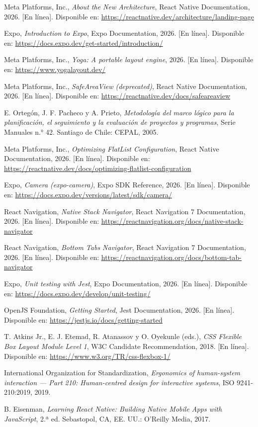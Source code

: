 \begin{enumerate}[label={[\arabic*]}, leftmargin=*, itemsep=3pt]
    \item Meta Platforms, Inc., \textit{About the New Architecture}, React Native Documentation, 2026. [En línea]. Disponible en: \url{https://reactnative.dev/architecture/landing-page}
    \item Expo, \textit{Introduction to Expo}, Expo Documentation, 2026. [En línea]. Disponible en: \url{https://docs.expo.dev/get-started/introduction/}
    \item Meta Platforms, Inc., \textit{Yoga: A portable layout engine}, 2026. [En línea]. Disponible en: \url{https://www.yogalayout.dev/}
    \item Meta Platforms, Inc., \textit{SafeAreaView (deprecated)}, React Native Documentation, 2026. [En línea]. Disponible en: \url{https://reactnative.dev/docs/safeareaview}
    \item E. Ortegón, J. F. Pacheco y A. Prieto, \textit{Metodología del marco lógico para la planificación, el seguimiento y la evaluación de proyectos y programas}, Serie Manuales n.° 42. Santiago de Chile: CEPAL, 2005.
    \item Meta Platforms, Inc., \textit{Optimizing FlatList Configuration}, React Native Documentation, 2026. [En línea]. Disponible en: \url{https://reactnative.dev/docs/optimizing-flatlist-configuration}
    \item Expo, \textit{Camera (expo-camera)}, Expo SDK Reference, 2026. [En línea]. Disponible en: \url{https://docs.expo.dev/versions/latest/sdk/camera/}
    \item React Navigation, \textit{Native Stack Navigator}, React Navigation 7 Documentation, 2026. [En línea]. Disponible en: \url{https://reactnavigation.org/docs/native-stack-navigator}
    \item React Navigation, \textit{Bottom Tabs Navigator}, React Navigation 7 Documentation, 2026. [En línea]. Disponible en: \url{https://reactnavigation.org/docs/bottom-tab-navigator}
    \item Expo, \textit{Unit testing with Jest}, Expo Documentation, 2026. [En línea]. Disponible en: \url{https://docs.expo.dev/develop/unit-testing/}
    \item OpenJS Foundation, \textit{Getting Started}, Jest Documentation, 2026. [En línea]. Disponible en: \url{https://jestjs.io/docs/getting-started}
    \item T. Atkins Jr., E. J. Etemad, R. Atanassov y O. Oyekunle (eds.), \textit{CSS Flexible Box Layout Module Level 1}, W3C Candidate Recommendation, 2018. [En línea]. Disponible en: \url{https://www.w3.org/TR/css-flexbox-1/}
    \item International Organization for Standardization, \textit{Ergonomics of human-system interaction — Part 210: Human-centred design for interactive systems}, ISO 9241-210:2019, 2019.
    \item B. Eisenman, \textit{Learning React Native: Building Native Mobile Apps with JavaScript}, 2.ª ed. Sebastopol, CA, EE. UU.: O'Reilly Media, 2017.
\end{enumerate}

